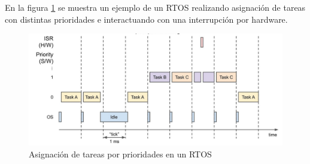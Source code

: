 En la figura \ref{fig:freertos_tasks} se muestra un ejemplo de un RTOS realizando asignación de tareas con distintas prioridades e interactuando con una interrupción por hardware. 

\begin{figure}[H]
    \centering
    \includegraphics[width = \linewidth]{img/freertos_tasks.jpeg}
    \caption{Asignación de tareas por prioridades en un RTOS}
    \label{fig:freertos_tasks}
\end{figure}


